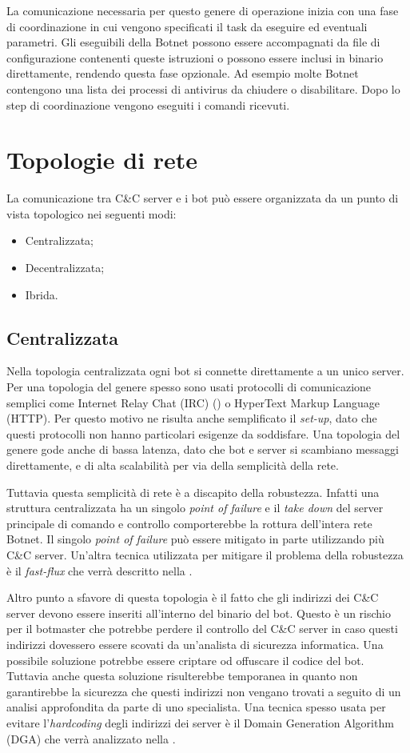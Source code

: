 La comunicazione necessaria per questo genere di operazione inizia con una fase di coordinazione in cui vengono specificati il task da eseguire ed eventuali parametri. Gli eseguibili della Botnet possono essere accompagnati da file di configurazione contenenti queste istruzioni o possono essere inclusi in binario direttamente, rendendo questa fase opzionale. Ad esempio molte Botnet contengono una lista dei processi di antivirus da chiudere o disabilitare. Dopo lo step di coordinazione vengono eseguiti i comandi ricevuti.
\section{Topologie di rete}
La comunicazione tra C\&C server e i bot può essere organizzata da un punto di vista topologico nei seguenti modi:
\begin{itemize}
    \item Centralizzata;
    \item Decentralizzata;
    \item Ibrida.
\end{itemize}

\subsection{Centralizzata}
Nella topologia centralizzata ogni bot si connette direttamente a un unico server.
Per una topologia del genere spesso sono usati protocolli di comunicazione semplici come Internet Relay Chat (IRC) () o HyperText Markup Language (HTTP). Per questo motivo ne risulta anche semplificato il \textit{set-up}, dato che questi protocolli non hanno particolari esigenze da soddisfare. 
Una topologia del genere gode anche di bassa latenza, dato che bot e server si scambiano messaggi direttamente, e di alta scalabilità per via della semplicità della rete. 

Tuttavia questa semplicità di rete è a discapito della robustezza. Infatti una struttura centralizzata ha un singolo \textit{point of failure} e il \textit{take down} del server principale di comando e controllo comporterebbe la rottura dell'intera rete Botnet. 
Il singolo \textit{point of failure} può essere mitigato in parte utilizzando più C\&C server.
Un'altra tecnica utilizzata per mitigare il problema della robustezza è il \textit{fast-flux} che verrà descritto nella .

Altro punto a sfavore di questa topologia è il fatto che gli indirizzi dei C\&C server devono essere inseriti all'interno del binario del bot. Questo è un rischio per il botmaster che potrebbe perdere il controllo del C\&C server in caso questi indirizzi dovessero essere scovati da un'analista di sicurezza informatica.
Una possibile soluzione potrebbe essere criptare od offuscare il codice del bot. Tuttavia anche questa soluzione risulterebbe temporanea in quanto non garantirebbe la sicurezza che questi indirizzi non vengano trovati a seguito di un analisi approfondita da parte di uno specialista.
Una tecnica spesso usata per evitare l'\textit{hardcoding} degli indirizzi dei server è il Domain Generation Algorithm (DGA) che verrà analizzato nella .

